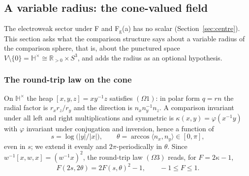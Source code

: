 \documentclass[aps,pra,onecolumn,superscriptaddress,nofootinbib,10pt]{revtex4-2}
\theoremstyle{definition}
\theoremstyle{remark}
\newcommand{\R}{\mathbb{R}}
\newcommand{\HH}{\mathbb{H}}
\newcommand{\ip}[2]{\langle #1,#2\rangle}
\newcommand{\hp}[3]{[#1,#2,#3]}
\begin{document}
\subsection{A variable radius: the cone-valued field}\label{sec:radial}
The electroweak sector under F and F$_{\mathrm g}$(a) has no scalar (Section~\ref{sec:centre}).  This section
asks what the comparison structure says about a variable radius of the comparison sphere, that is,
about the punctured space $V\setminus\{0\}=\HH^\times\cong\R_{>0}\times S^3$, and adds the radius as an optional hypothesis.

\subsubsection{The round-trip law on the cone}
On $\HH^\times$ the heap $\hp xyz=xy^{-1}z$ satisfies $(\Omega1)$: in polar form $q=rn$ the radial factor is $r_xr_z/r_y$
and the direction is $n_xn_y^{-1}n_z$.  A comparison invariant under all left and right multiplications and
symmetric is $\kappa(x,y)=\varphi(x^{-1}y)$ with $\varphi$ invariant under conjugation and inversion, hence a function of
\[
s=\log\bigl(\lvert y\rvert/\lvert x\rvert\bigr),\qquad \theta=\arccos\ip{n_x}{n_y}\in[0,\pi],
\]
even in $s$; we extend it evenly and $2\pi$-periodically in $\theta$.  Since $w^{-1}\hp xwx=(w^{-1}x)^2$, the round-trip
law $(\Omega3)$ reads, for $F=2\kappa-1$,
\begin{equation}\label{eq:conelaw}
F(2s,2\theta)=2F(s,\theta)^2-1,\qquad -1\le F\le1 .
\end{equation}
\end{document}
